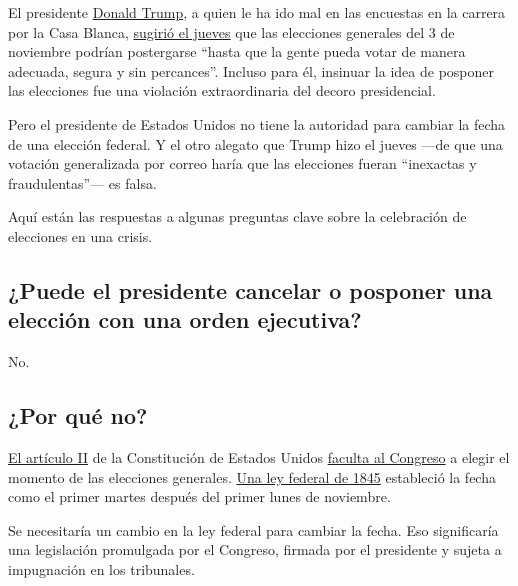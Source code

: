 El presidente
\href{https://www.nytimes.com/es/interactive/2020/espanol/estados-unidos/donald-trump-elecciones.html}{Donald
Trump}, a quien le ha ido mal en las encuestas en la carrera por la Casa
Blanca,
\href{https://www.nytimes.com/2020/07/30/us/elections/biden-vs-trump.html}{sugirió
el jueves} que las elecciones generales del 3 de noviembre podrían
postergarse ``hasta que la gente pueda votar de manera adecuada, segura
y sin percances''. Incluso para él, insinuar la idea de posponer las
elecciones fue una violación extraordinaria del decoro presidencial.

Pero el presidente de Estados Unidos no tiene la autoridad para cambiar
la fecha de una elección federal. Y el otro alegato que Trump hizo el
jueves ---de que una votación generalizada por correo haría que las
elecciones fueran ``inexactas y fraudulentas''--- es falsa.

Aquí están las respuestas a algunas preguntas clave sobre la celebración
de elecciones en una crisis.

\hypertarget{puede-el-presidente-cancelar-o-posponer-una-elecciuxf3n-con-una-orden-ejecutiva}{%
\subsection{¿Puede el presidente cancelar o posponer una elección con
una orden
ejecutiva?}\label{puede-el-presidente-cancelar-o-posponer-una-elecciuxf3n-con-una-orden-ejecutiva}}

No.

\hypertarget{por-quuxe9-no}{%
\subsection{¿Por qué no?}\label{por-quuxe9-no}}

\href{https://constitution.congress.gov/browse/essay/artII-S1-C4-1/ALDE_00000230/}{El
artículo II} de la Constitución de Estados Unidos
\href{https://crsreports.congress.gov/product/pdf/R/R46413}{faculta al
Congreso} a elegir el momento de las elecciones generales.
\href{https://www.loc.gov/law/help/statutes-at-large/28th-congress/session-2/c28s2ch1.pdf}{Una
ley federal de 1845} estableció la fecha como el primer martes después
del primer lunes de noviembre.

Se necesitaría un cambio en la ley federal para cambiar la fecha. Eso
significaría una legislación promulgada por el Congreso, firmada por el
presidente y sujeta a impugnación en los tribunales.


